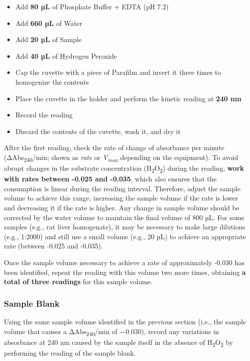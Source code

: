 \documentclass[
  9pt,
  american,
  a5paper,
  extrafontsizes,onecolumn,openright
  ]{memoir}
\providecommand{\tightlist}{%
  \setlength{\itemsep}{0pt}\setlength{\parskip}{0pt}}
\newlength{\rf}
\begin{document}
\begin{itemize}
\tightlist
\item
  Add \textbf{80 µL} of Phosphate Buffer + EDTA (pH 7.2)
\item
  Add \textbf{660 µL} of Water
\item
  Add \textbf{20 µL} of Sample
\item
  Add \textbf{40 µL} of Hydrogen Peroxide
\item
  Cap the cuvette with a piece of Parafilm and invert it three times to homogenize the contents
\item
  Place the cuvette in the holder and perform the kinetic reading at \textbf{240 nm}
\item
  Record the reading
\item
  Discard the contents of the cuvette, wash it, and dry it
\end{itemize}

After the first reading, check the rate of change of absorbance per minute (ΔAbs\textsubscript{240}/min; shown as \emph{rate} or \emph{V\textsubscript{max}} depending on the equipment). To avoid abrupt changes in the substrate concentration (H\textsubscript{2}O\textsubscript{2}) during the reading, \textbf{work with rates between -0.025 and -0.035}, which also ensures that the consumption is linear during the reading interval. Therefore, adjust the sample volume to achieve this range, increasing the sample volume if the rate is lower and decreasing it if the rate is higher. Any change in sample volume should be corrected by the water volume to maintain the final volume of 800 µL. For some samples (e.g., rat liver homogenate), it may be necessary to make large dilutions (e.g., 1:2000) and still use a small volume (e.g., 20 µL) to achieve an appropriate rate (between -0.025 and -0.035).

Once the sample volume necessary to achieve a rate of approximately -0.030 has been identified, repeat the reading with this volume two more times, obtaining \textbf{a total of three readings} for this sample volume.

\subsubsection{Sample Blank}\label{sample_blank}

Using the same sample volume identified in the previous section (i.e., the sample volume that causes a ΔAbs\textsubscript{240}/min of \textasciitilde-0.030), record any variations in absorbance at 240 nm caused by the sample itself in the absence of H\textsubscript{2}O\textsubscript{2} by performing the reading of the sample blank.
\end{document}
